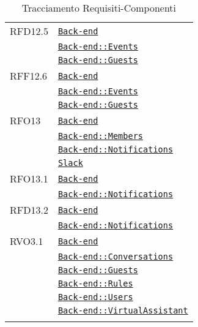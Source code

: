 \begin{longtable}{|>{\centering}m{3cm}|m{10cm}<{\centering}|}
RFD12.5 & \hyperref[Back-end]{\texttt{Back-end}}\\
& \hyperref[Back-end::Events]{\texttt{Back-end::Events}}\\
& \hyperref[Back-end::Guests]{\texttt{Back-end::Guests}}\\ \hline

RFF12.6 & \hyperref[Back-end]{\texttt{Back-end}}\\
& \hyperref[Back-end::Events]{\texttt{Back-end::Events}}\\
& \hyperref[Back-end::Guests]{\texttt{Back-end::Guests}}\\ \hline

RFO13 & \hyperref[Back-end]{\texttt{Back-end}}\\
& \hyperref[Back-end::Members]{\texttt{Back-end::Members}}\\
& \hyperref[Back-end::Notifications]{\texttt{Back-end::Notifications}}\\
& \hyperref[Slack]{\texttt{Slack}}\\ \hline

RFO13.1 & \hyperref[Back-end]{\texttt{Back-end}}\\
& \hyperref[Back-end::Notifications]{\texttt{Back-end::Notifications}}\\ \hline

RFD13.2 & \hyperref[Back-end]{\texttt{Back-end}}\\
& \hyperref[Back-end::Notifications]{\texttt{Back-end::Notifications}}\\ \hline

RVO3.1 & \hyperref[Back-end]{\texttt{Back-end}}\\
& \hyperref[Back-end::Conversations]{\texttt{Back-end::Conversations}}\\
& \hyperref[Back-end::Guests]{\texttt{Back-end::Guests}}\\
& \hyperref[Back-end::Rules]{\texttt{Back-end::Rules}}\\
& \hyperref[Back-end::Users]{\texttt{Back-end::Users}}\\
& \hyperref[Back-end::VirtualAssistant]{\texttt{Back-end::VirtualAssistant}}\\ \hline

\caption[Tracciamento Requisiti-Componenti]{Tracciamento Requisiti-Componenti}
\label{tabella:requi-pack}
\end{longtable}
\clearpage
